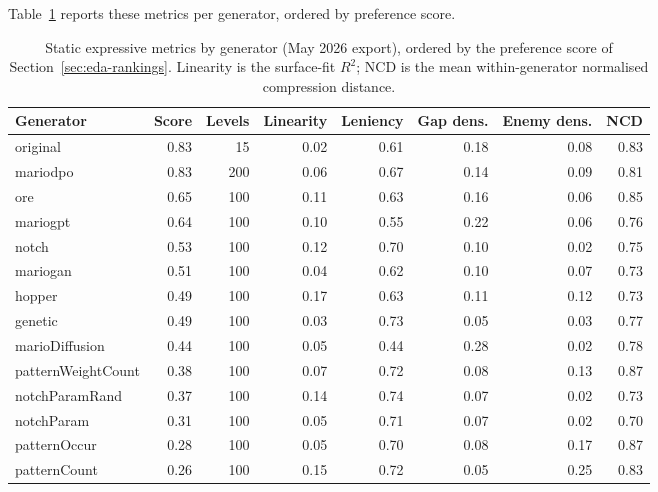 \documentclass[shortabstract, mgr, english]{iithesis}
\begin{document}
Table~\ref{tab:eda-static-metrics} reports these metrics per
generator, ordered by preference score.

\begin{table}[H]
\centering
\footnotesize
\setlength{\tabcolsep}{3.5pt}
\begin{tabular}{@{} l r r r r r r r @{}}
\toprule
\textbf{Generator} & \textbf{Score} & \textbf{Levels} & \textbf{Linearity} & \textbf{Leniency} & \textbf{Gap dens.} & \textbf{Enemy dens.} & \textbf{NCD} \\
\midrule
original           & 0.83 & 15  & 0.02 & 0.61 & 0.18 & 0.08 & 0.83 \\
mariodpo           & 0.83 & 200 & 0.06 & 0.67 & 0.14 & 0.09 & 0.81 \\
ore                & 0.65 & 100 & 0.11 & 0.63 & 0.16 & 0.06 & 0.85 \\
mariogpt           & 0.64 & 100 & 0.10 & 0.55 & 0.22 & 0.06 & 0.76 \\
notch              & 0.53 & 100 & 0.12 & 0.70 & 0.10 & 0.02 & 0.75 \\
mariogan           & 0.51 & 100 & 0.04 & 0.62 & 0.10 & 0.07 & 0.73 \\
hopper             & 0.49 & 100 & 0.17 & 0.63 & 0.11 & 0.12 & 0.73 \\
genetic            & 0.49 & 100 & 0.03 & 0.73 & 0.05 & 0.03 & 0.77 \\
marioDiffusion     & 0.44 & 100 & 0.05 & 0.44 & 0.28 & 0.02 & 0.78 \\
patternWeightCount & 0.38 & 100 & 0.07 & 0.72 & 0.08 & 0.13 & 0.87 \\
notchParamRand     & 0.37 & 100 & 0.14 & 0.74 & 0.07 & 0.02 & 0.73 \\
notchParam         & 0.31 & 100 & 0.05 & 0.71 & 0.07 & 0.02 & 0.70 \\
patternOccur       & 0.28 & 100 & 0.05 & 0.70 & 0.08 & 0.17 & 0.87 \\
patternCount       & 0.26 & 100 & 0.15 & 0.72 & 0.05 & 0.25 & 0.83 \\
\bottomrule
\end{tabular}
\caption{Static expressive metrics by generator (May 2026 export),
ordered by the preference score of Section~\ref{sec:eda-rankings}. Linearity
is the surface-fit $R^2$; NCD is the mean within-generator normalised
compression distance.}
\label{tab:eda-static-metrics}
\end{table}
\end{document}
